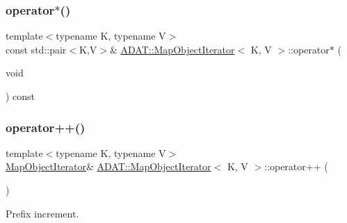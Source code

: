 \mbox{\label{classADAT_1_1MapObjectIterator_a3faecdcae68181e91e40dad404296ed7}} 
\subsubsection{\texorpdfstring{operator$\ast$()}{operator*()}\hspace{0.1cm}{\footnotesize\ttfamily [2/2]}}
{\footnotesize\ttfamily template$<$typename K, typename V$>$ \\
const std\+::pair$<$K,V$>$\& \mbox{\hyperlink{classADAT_1_1MapObjectIterator}{A\+D\+A\+T\+::\+Map\+Object\+Iterator}}$<$ K, V $>$\+::operator$\ast$ (\begin{DoxyParamCaption}\item[{void}]{ }\end{DoxyParamCaption}) const\hspace{0.3cm}{\ttfamily [inline]}}

\mbox{\label{classADAT_1_1MapObjectIterator_a2eedaf3b2fc70d48afd45bd37c5e6e69}} 
\subsubsection{\texorpdfstring{operator++()}{operator++()}\hspace{0.1cm}{\footnotesize\ttfamily [1/4]}}
{\footnotesize\ttfamily template$<$typename K, typename V$>$ \\
\mbox{\hyperlink{classADAT_1_1MapObjectIterator}{Map\+Object\+Iterator}}\& \mbox{\hyperlink{classADAT_1_1MapObjectIterator}{A\+D\+A\+T\+::\+Map\+Object\+Iterator}}$<$ K, V $>$\+::operator++ (\begin{DoxyParamCaption}{ }\end{DoxyParamCaption})\hspace{0.3cm}{\ttfamily [inline]}}



Prefix increment. 

